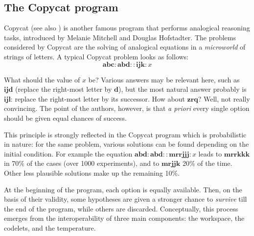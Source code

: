 \subsection{The Copycat program}
\label{SEC:copycat}

Copycat \cite{Mit93} (see also \cite{HofMit94}) is another famous program that
performs analogical reasoning tasks, introduced by Melanie Mitchell and Douglas
Hofstadter. The problems considered by Copycat are the solving of analogical
equations in a \textit{microworld} of strings of letters. A typical Copycat
problem looks as follows: $$\mathbf{abc} : \mathbf{abd} :: \mathbf{ijk} : x$$

What should the value of $x$ be? Various answers may be relevant here, such as
$\mathbf{ijd}$ (replace the right-most letter by $\mathbf{d}$), but the most
natural answer probably is $\mathbf{ijl}$: replace the right-most letter by its
successor. How about $\mathbf{zrq}$? Well, not really convincing. The point of
the authors, however, is that \textit{a priori} every single option should be
given equal chances of success.

This principle is strongly reflected in the Copycat program which is
probabilistic in nature: for the same problem, various solutions can be found
depending on the initial condition. For example the  equation $\mathbf{abd} :
\mathbf{abd} :: \mathbf{mrrjjj} : x$ leads to $\mathbf{mrrkkk}$ in 70\% of the
cases (over 1000 experiments), and to $\mathbf{mrjjk}$ 20\% of the time. Other
less plausible solutions make up the remaining 10\%.

At the beginning of the program, each option is equally available.  Then, on
the basis of their validity, some hypotheses are given a stronger chance to
\textit{survive} till the end of the program, while others are discarded.
Conceptually, this process emerges from the interoperability of three main
components: the workspace, the codelets, and the temperature.

